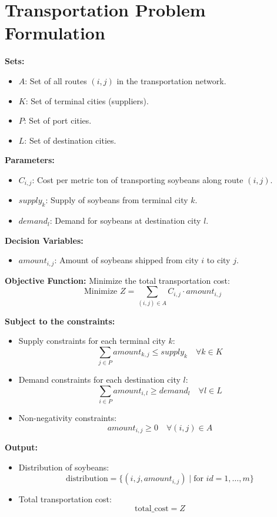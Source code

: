 \documentclass{article}
\begin{document}
\section*{Transportation Problem Formulation}

\textbf{Sets:}
\begin{itemize}
    \item $A$: Set of all routes $(i, j)$ in the transportation network.
    \item $K$: Set of terminal cities (suppliers).
    \item $P$: Set of port cities.
    \item $L$: Set of destination cities.
\end{itemize}

\textbf{Parameters:}
\begin{itemize}
    \item $C_{i,j}$: Cost per metric ton of transporting soybeans along route $(i, j)$.
    \item $supply_k$: Supply of soybeans from terminal city $k$.
    \item $demand_l$: Demand for soybeans at destination city $l$.
\end{itemize}

\textbf{Decision Variables:}
\begin{itemize}
    \item $amount_{i,j}$: Amount of soybeans shipped from city $i$ to city $j$.
\end{itemize}

\textbf{Objective Function:}
Minimize the total transportation cost:
\[
\text{Minimize } Z = \sum_{(i,j) \in A} C_{i,j} \cdot amount_{i,j}
\]

\textbf{Subject to the constraints:}
\begin{itemize}
    \item Supply constraints for each terminal city $k$:
    \[
    \sum_{j \in P} amount_{k,j} \leq supply_k \quad \forall k \in K
    \]
    \item Demand constraints for each destination city $l$:
    \[
    \sum_{i \in P} amount_{i,l} \geq demand_l \quad \forall l \in L
    \]
    \item Non-negativity constraints:
    \[
    amount_{i,j} \geq 0 \quad \forall (i,j) \in A
    \]
\end{itemize}

\textbf{Output:}
\begin{itemize}
    \item Distribution of soybeans:
    \[
    \text{distribution} = \{(i, j, amount_{i,j}) \mid \text{for } id = 1, \ldots, m\}
    \]
    \item Total transportation cost:
    \[
    \text{total\_cost} = Z
    \]
\end{itemize}
\end{document}
